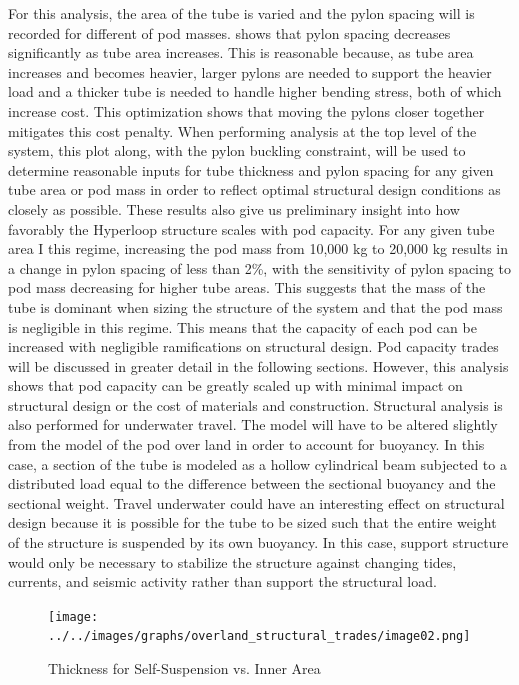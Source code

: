 For this analysis, the area of the tube is varied and the pylon spacing will is recorded for different of pod masses.  shows that pylon spacing decreases significantly as tube area increases. This is reasonable because, as tube area increases and becomes heavier, larger pylons are needed to support the heavier load and a thicker tube is needed to handle higher bending stress, both of which increase cost. This optimization shows that moving the pylons closer together mitigates this cost penalty. When performing analysis at the top level of the system, this plot along, with the pylon buckling constraint, will be used to determine reasonable inputs for tube thickness and pylon spacing for any given tube area or pod mass in order to reflect optimal structural design conditions as closely as possible.
These results also give us preliminary insight into how favorably the Hyperloop structure scales with pod capacity. For any given tube area I this regime, increasing the pod mass from 10,000 kg to 20,000 kg results in a change in pylon spacing of less than 2\%, with the sensitivity of pylon spacing to pod mass decreasing for higher tube areas. This suggests that the mass of the tube is dominant when sizing the structure of the system and that the pod mass is negligible in this regime. This means that the capacity of each pod can be increased with negligible ramifications on structural design. Pod capacity trades will be discussed in greater detail in the following sections. However, this analysis shows that pod capacity can be greatly scaled up with minimal impact on structural design or the cost of materials and construction.
Structural analysis is also performed for underwater travel. The model will have to be altered slightly from the model of the pod over land in order to account for buoyancy. In this case, a section of the tube is modeled as a hollow cylindrical beam subjected to a distributed load equal to the difference between the sectional buoyancy and the sectional weight. Travel underwater could have an interesting effect on structural design because it is possible for the tube to be sized such that the entire weight of the structure is suspended by its own buoyancy. In this case, support structure would only be necessary to stabilize the structure against changing tides, currents, and seismic activity rather than support the structural load.

\begin{figure}
	\centering
	\texttt{[image: ../../images/graphs/overland\_structural\_trades/image02.png]}
	\caption{Thickness for Self-Suspension vs. Inner Area}
	\label{fig:thick_susp_vs_area}
\end{figure}

